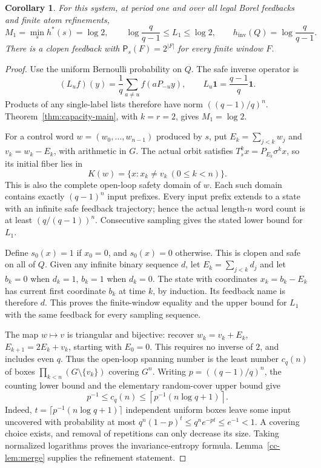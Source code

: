 \documentclass[11pt,reqno]{amsart}
\numberwithin{equation}{section}
\newtheorem{corollary}[theorem]{Corollary}
\theoremstyle{definition}
\theoremstyle{definition}
\newcommand{\Patt}{\mathsf P}
\newcommand{\hinv}{h_{\mathrm{inv}}}
\newcommand{\one}{\mathbf 1}
\begin{document}
\begin{corollary}\label{cor:cyclic}
For this system, at period one and over all legal Borel feedbacks
and finite atom refinements,
\[
 M_1=\min_s h^*(s)=\log2,\qquad
 \log\frac q{q-1}\le L_1\le\log2,\qquad
 \hinv(Q)=\log\frac q{q-1}.
\]
There is a clopen feedback with $\Patt_s(F)=2^{|F|}$ for every
finite window $F$.
\end{corollary}
\begin{proof}
Use the uniform Bernoulli probability on $Q$. The safe inverse
operator is
\[
 (L_uf)(y)=\frac1q\sum_{a\ne u}f(aP_{-u}y),
 \qquad L_u\one=\frac{q-1}{q}\one.
\]
Products of any single-label lists therefore have norm
$((q-1)/q)^n$. Theorem~\ref{thm:capacity-main}, with $k=r=2$,
gives $M_1=\log2$.

For a control word $w=(w_0,\ldots,w_{n-1})$ produced by $s$, put
$E_k=\sum_{j<k}w_j$ and $v_k=w_k-E_k$, with arithmetic in $G$.
The actual orbit satisfies $T_s^kx=P_{E_k}\sigma^kx$, so its
initial fiber lies in
\[
 K(w)=\{x:x_k\ne v_k\ (0\le k<n)\}.
\]
This is also the complete open-loop safety domain of $w$.
Each such domain contains exactly $(q-1)^n$ input prefixes.
Every input prefix extends to a state with an infinite safe
feedback trajectory; hence the actual length-$n$ word count is
at least $(q/(q-1))^n$. Consecutive sampling gives the stated
lower bound for $L_1$.

Define $s_0(x)=1$ if $x_0=0$, and $s_0(x)=0$ otherwise.
This is clopen and safe on all of $Q$. Given any infinite binary
sequence $d$, let $E_k=\sum_{j<k}d_j$ and let $b_k=0$ when
$d_k=1$, $b_k=1$ when $d_k=0$. The state with coordinates
$x_k=b_k-E_k$ has current first coordinate $b_k$ at time $k$,
by induction. Its feedback name is therefore $d$.
This proves the finite-window equality and the upper bound for
$L_1$ with the same feedback for every sampling sequence.

The map $w\mapsto v$ is triangular and bijective: recover
$w_k=v_k+E_k$, $E_{k+1}=2E_k+v_k$, starting with $E_0=0$.
This requires no inverse of $2$, and includes even $q$.
Thus the open-loop spanning number is the least number $c_q(n)$
of boxes $\prod_{k<n}(G\setminus\{v_k\})$ covering $G^n$.
Writing $p=((q-1)/q)^n$, the counting lower bound and the
elementary random-cover upper bound give
\[
 p^{-1}\le c_q(n)\le
 \left\lceil p^{-1}(n\log q+1)\right\rceil.
\]
Indeed, $t=\lceil p^{-1}(n\log q+1)\rceil$ independent uniform
boxes leave some input uncovered with probability at most
$q^n(1-p)^t\le q^ne^{-pt}\le e^{-1}<1$.
A covering choice exists, and removal of repetitions can only
decrease its size. Taking normalized logarithms proves the
invariance-entropy formula. Lemma~\ref{cc-lem:merge} supplies
the refinement statement.
\end{proof}
\end{document}
